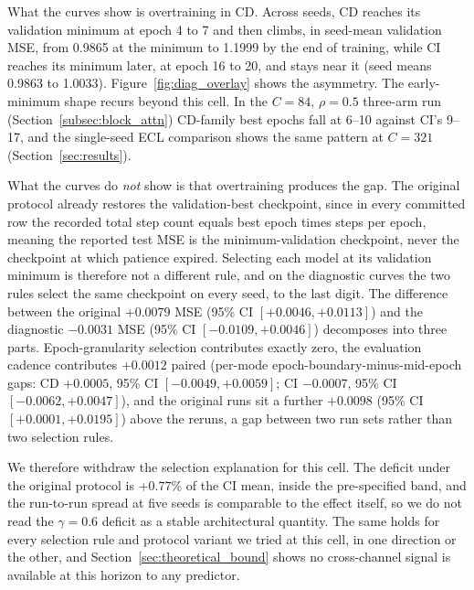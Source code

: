 \documentclass[10pt]{article} %
\begin{document}
    What the curves show is overtraining in CD. Across seeds, CD reaches its validation minimum at epoch 4 to 7 and then climbs,
    in seed-mean validation MSE, from 0.9865 at the minimum to 1.1999 by the end of training, while CI reaches its minimum later,
    at epoch 16 to 20, and stays near it (seed means 0.9863 to 1.0033). Figure~\ref{fig:diag_overlay} shows the asymmetry. The
    early-minimum shape recurs beyond this cell. In the $C = 84$, $\rho = 0.5$ three-arm run (Section~\ref{subsec:block_attn})
    CD-family best epochs fall at 6--10 against CI's 9--17, and the single-seed ECL comparison shows the same pattern at $C = 321$
    (Section~\ref{sec:results}).

    What the curves do \emph{not} show is that overtraining produces the gap. The original protocol already restores the
    validation-best checkpoint, since in every committed row the recorded total step count equals best epoch times steps per
    epoch, meaning the reported test MSE is the minimum-validation checkpoint, never the checkpoint at which patience expired.
    Selecting each model at its validation minimum is therefore not a different rule, and on the diagnostic curves the
    two rules select the same checkpoint on every seed, to the last digit. The difference between the original
    $+0.0079$ MSE (95\% CI $[+0.0046, +0.0113]$) and the diagnostic $-0.0031$ MSE (95\% CI $[-0.0109, +0.0046]$)
    decomposes into three parts. Epoch-granularity selection contributes exactly zero, the evaluation cadence contributes
    $+0.0012$ paired (per-mode epoch-boundary-minus-mid-epoch gaps: CD $+0.0005$, 95\% CI $[-0.0049, +0.0059]$; CI
    $-0.0007$, 95\% CI $[-0.0062, +0.0047]$), and the original runs sit a further $+0.0098$ (95\% CI
    $[+0.0001, +0.0195]$) above the reruns, a gap between two run sets rather than two selection rules.

    We therefore withdraw the selection explanation for this cell. The deficit under the original protocol is $+0.77\%$
    of the CI mean, inside the pre-specified band, and the run-to-run spread at five seeds is comparable to the effect
    itself, so we do not read the $\gamma = 0.6$ deficit as a stable architectural quantity. The same holds for every
    selection rule and protocol variant we tried at this cell, in one direction or the other, and
    Section~\ref{sec:theoretical_bound} shows no cross-channel signal is available at this horizon to any predictor.
\end{document}
